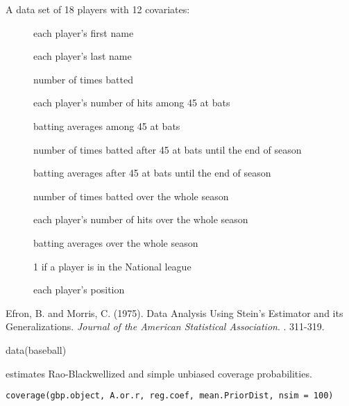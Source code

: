\documentclass[a4paper]{book}
\begin{document}
%
\begin{Format}
A data set of 18 players with 12 covariates:
\begin{description}

\item[] each player's first name
\item[] each player's last name
\item[] number of times batted
\item[] each player's number of hits among 45 at bats
\item[] batting averages among 45 at bats
\item[] number of times batted after 45 at bats until the end of season
\item[] batting averages after 45 at bats until the end of season
\item[] number of times batted over the whole season
\item[] each player's number of hits over the whole season
\item[] batting averages over the whole season
\item[] 1 if a player is in the National league
\item[] each player's position

\end{description}

\end{Format}
%
\begin{Source}\relax
Efron, B. and Morris, C. (1975). Data Analysis Using Stein's Estimator and its Generalizations. \emph{Journal of the American Statistical Association}. . 311-319.
\end{Source}
%
\begin{Examples}
\begin{ExampleCode}
  data(baseball)
\end{ExampleCode}
\end{Examples}
%
\begin{Description}\relax
{} estimates Rao-Blackwellized and simple unbiased coverage probabilities.
\end{Description}
%
\begin{Usage}
\begin{verbatim}
coverage(gbp.object, A.or.r, reg.coef, mean.PriorDist, nsim = 100)
\end{verbatim}
\end{Usage}
\end{document}
